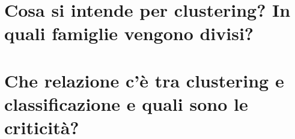 \documentclass[\main/main.tex]{subfiles}
\begin{document}
\section{Cosa si intende per clustering? In quali famiglie vengono divisi?}
\section{Che relazione c'è tra clustering e classificazione e quali sono le criticità?}
\end{document}
